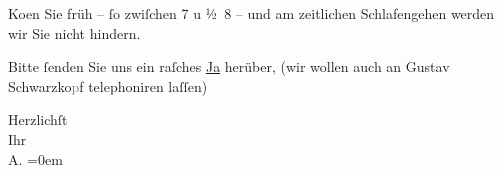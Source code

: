 \pstart
           Ko{\geminationm}en Sie früh –{ }ſo zwiſchen 7 u
                  ½ 8 – und {\pb}am zeitlichen Schlafengehen
               werden wir Sie nicht hindern.\pend
           
\pstart
           Bitte{ }ſenden Sie uns ein raſches \uline{Ja} herüber, (wir
               wollen auch {\pb}an Gustav Schwarzko\textcolor{gray}{p}f telephoniren laſſen)\pend
           
\pstart
           Herzlichſt{\\[\baselineskip]}Ihr{\\[\baselineskip]}\spacefill\mbox{A.}\pend
           \leftskip=0em{}\endnumbering{}  \newcommand{\dateiname}{L01918}\newcommand{\titel}{Arthur Schnitzler an Richard Beer-Hofmann, 20. 3. 1910}\newcommand{\editorInnen}{Martin Anton Müller und Gerd-Hermann Susen}
